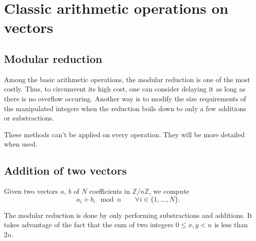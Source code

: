 \documentclass[a4paper]{article}
\begin{document}
\section{Classic arithmetic operations on vectors}

\subsection{Modular reduction}

Among the basic arithmetic operations, the modular reduction is one of the most costly. 
Thus, to circumvent its high cost, one can consider delaying it as long as there is no overflow occuring.
Another way is to modify the size requirements of the manipulated integers when the reduction boils down to
only a few additions or substractions.

These methods can't be applied on every operation. They will be more detailed when used.

\subsection{Addition of two vectors}

Given two vectors $a$, $b$ of $N$ coefficients in $\mathbb{Z}/n\mathbb{Z}$, we compute
\[
a_i + b_i \mod n \qquad \forall i\in \{1,\dots,N\}.
\]


\begin{remark}
    The modular reduction is done by only performing substractions and additions. It takes advantage of
    the fact that the sum of two integers $0 \leq x,y < n$ is less than $2n$.
\end{remark}
\end{document}
